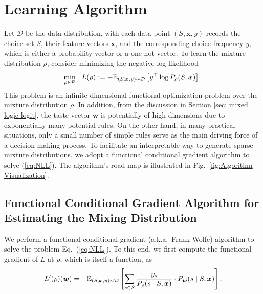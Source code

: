 \documentclass{article} %
\begin{document}
\section{Learning Algorithm}

%
%
%
%
%
%
%

Let $\mathcal{D}$ be the data distribution, with each data point $(S, \boldsymbol{x}, y)$ records the choice set $S$, their feature vectors $\boldsymbol{x}$, and the corresponding choice frequency $y$, which is either a probability vector or a one-hot vector. To learn the mixture distribution $\rho$, consider minimizing the negative log-likelihood
\begin{align}
\min_{\rho \in \mathcal{P}} \ \ L(\rho) := -\mathbb{E}_{(S,\boldsymbol{x},y)\sim\mathcal{D}}\left[ y^\top \log P_\rho(S,\boldsymbol{x}) \right].
\label{eq:NLL}
\end{align}
This problem is an infinite-dimensional functional optimization problem over the mixture distribution $\rho$. In addition, from the discussion in Section \ref{sec: mixed logic-logit}, the taste vector $\boldsymbol{w}$ is potentially of high dimensions due to exponentially many potential rules. On the other hand, in many practical situations, only a small number of simple rules serve as the main driving force of a decision-making process. To facilitate an interpretable way to generate sparse mixture distributions, we adopt a functional conditional gradient algorithm to solve (\ref{eq:NLL}). The algorithm's road map is illustrated in Fig.~\ref{fig:Algorithm Visualization}.
%
%



%

%

%
%
%
%
%
%
%
%
%
%

%
%
%

%

%
%
%
%
%
%
%
%
%
%

%
%
%
%
%
%
%
%
%
%


\subsection{Functional Conditional Gradient Algorithm for Estimating the Mixing Distribution}

We perform a functional conditional gradient (a.k.a.~Frank-Wolfe) algorithm \citep{bach2017breaking} to solve the problem Eq.~(\ref{eq:NLL}). To this end, we first compute the functional gradient of $L$ at $\rho$, which is itself a function, as 
\begin{equation}\label{eq: functional gradient}
  L'(\rho)(\boldsymbol{w}) = -\mathbb{E}_{(S,\boldsymbol{x},y)\sim\mathcal{D}}\left[ \sum_{s\in S} \frac{y_s}{P_\rho(s\mid S,\boldsymbol{x})} \cdot P_{\boldsymbol{w}}(s\mid S,\boldsymbol{x}) \right].
\end{equation}
\end{document}
